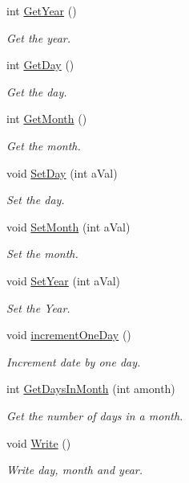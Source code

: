 \begin{DoxyCompactItemize}
int \mbox{\hyperlink{classtime_class_afe3b5cacaca30b738a82ceea12d9afda}{Get\+Year}} ()
\begin{DoxyCompactList}\small\item\em Get the year. \end{DoxyCompactList}\item 
int \mbox{\hyperlink{classtime_class_aa593aee7c9ef8d70716e1f9fb3206545}{Get\+Day}} ()
\begin{DoxyCompactList}\small\item\em Get the day. \end{DoxyCompactList}\item 
int \mbox{\hyperlink{classtime_class_a33068a0b7d33d339875e4e31382223f2}{Get\+Month}} ()
\begin{DoxyCompactList}\small\item\em Get the month. \end{DoxyCompactList}\item 
void \mbox{\hyperlink{classtime_class_aa22bf20129df0d1b9ad983e3a8a7643f}{Set\+Day}} (int a\+Val)
\begin{DoxyCompactList}\small\item\em Set the day. \end{DoxyCompactList}\item 
void \mbox{\hyperlink{classtime_class_a4258de73d22742686c824673e1f08c6d}{Set\+Month}} (int a\+Val)
\begin{DoxyCompactList}\small\item\em Set the month. \end{DoxyCompactList}\item 
void \mbox{\hyperlink{classtime_class_a79d58ba7b93a061a0275fc5f0b70285c}{Set\+Year}} (int a\+Val)
\begin{DoxyCompactList}\small\item\em Set the Year. \end{DoxyCompactList}\item 
\mbox{\label{classtime_class_af97ba8f356b5f00503596d703d556623}} 
void \mbox{\hyperlink{classtime_class_af97ba8f356b5f00503596d703d556623}{increment\+One\+Day}} ()
\begin{DoxyCompactList}\small\item\em Increment date by one day. \end{DoxyCompactList}\item 
int \mbox{\hyperlink{classtime_class_a32dd8f1721ce77bac40e301d14805be4}{Get\+Days\+In\+Month}} (int amonth)
\begin{DoxyCompactList}\small\item\em Get the number of days in a month. \end{DoxyCompactList}\item 
\mbox{\label{classtime_class_a5d91f0093fdb3f9c16dbd945703e0725}} 
void \mbox{\hyperlink{classtime_class_a5d91f0093fdb3f9c16dbd945703e0725}{Write}} ()
\begin{DoxyCompactList}\small\item\em Write day, month and year. \end{DoxyCompactList}\end{DoxyCompactItemize}


